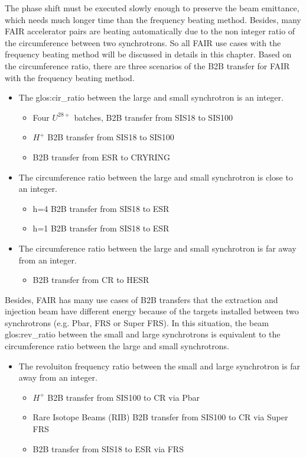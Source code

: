 The phase shift must be executed slowly enough to preserve the beam emittance, which needs much longer time than the frequency beating method. Besides, many FAIR accelerator pairs are beating automatically due to the non integer ratio of the circumference between two synchrotrons. So all FAIR use cases with the frequency beating method will be discussed in details in this chapter. Based on the circumference ratio, there are three scenarios of the B2B transfer for FAIR with the frequency beating method. 
\begin{itemize}
	\item The \gls{glos:cir_ratio} between the large and small synchrotron is an integer.
		\begin{itemize}
			\item	Four $U^{28+}$ batches,  B2B transfer from SIS18 to SIS100
			\item $H^{+}$ B2B transfer from SIS18 to SIS100
			\item B2B transfer from ESR to CRYRING
		\end{itemize}
	\item The circumference ratio between the large and small synchrotron is close to an integer.
		\begin{itemize}
			\item h=4 B2B transfer from SIS18 to ESR
			\item h=1 B2B transfer from SIS18 to ESR
		\end{itemize}
 	\item The circumference ratio between the large and small synchrotron is far away from an integer.
		\begin{itemize}
			\item B2B transfer from CR to HESR
		\end{itemize}
\end{itemize}
Besides, FAIR has many use cases of B2B transfers that the extraction and injection beam have different energy because of the targets installed between two synchrotrons (e.g. Pbar, FRS or Super FRS). In this situation, the beam \gls{glos:rev_ratio} between the small and large synchrotrons is equivalent to the circumference ratio between the large and small synchrotrons. 

\begin{itemize}

 	\item The revoluiton frequency ratio between the small and large synchrotron is far away from an integer.
		\begin{itemize}
			\item $H^{+}$ B2B transfer from SIS100 to CR via Pbar
			\item Rare Isotope Beams (\gls{RIB}) B2B transfer from SIS100 to CR via Super FRS
			\item B2B transfer from SIS18 to ESR via FRS
		\end{itemize}
\end{itemize}
  
